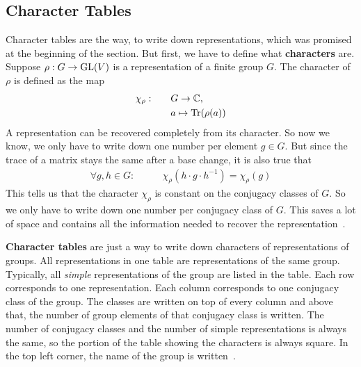 \subsection{Character Tables}

Character tables are the way, to write down representations, which was promised at the beginning of the section.
But first, we have to define what \textbf{characters} are.
Suppose $\rho: G \to \operatorname{GL}(V)$ is a representation of a finite group $G$.
The character of $\rho$ is defined as the map
\begin{subequations}
    \begin{align}
        \chi_\rho: \qquad & G \to \mathbb{C}, \\
        & a \mapsto \operatorname{Tr}(\rho(a))
    \end{align}
\end{subequations}
A representation can be recovered completely from its character.
So now we know, we only have to write down one number per element $g \in G$.
But since the trace of a matrix stays the same after a base change, it is also true that
\begin{align}
    \forall g, h \in G: \qquad & \chi_\rho(h \cdot g \cdot h^{-1}) = \chi_\rho(g)
\end{align}
This tells us that the character $\chi_\rho$ is constant on the conjugacy classes of $G$.
So we only have to write down one number per conjugacy class of $G$.
This saves a lot of space and contains all the information needed to recover the representation~\cite{fulton2013}.

\textbf{Character tables} are just a way to write down characters of representations of groups.
All representations in one table are representations of the same group.
Typically, all \textit{simple} representations of the group are listed in the table.
Each row corresponds to one representation.
Each column corresponds to one conjugacy class of the group.
The classes are written on top of every column and above that, the number of group elements of that conjugacy class is written.
The number of conjugacy classes and the number of simple representations is always the same, so the portion of the table showing the characters is always square.
In the top left corner, the name of the group is written~\cite{fulton2013}.
